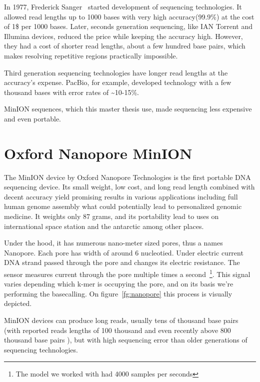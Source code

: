 \documentclass[times, utf8, diplomski, english]{fer}
\begin{document}
In 1977, Frederick Sanger~\citep{mile}\citep{Pettersson2009} started development of sequencing technologies. It allowed read lengths up to 1000 bases with very high accuracy(99.9\%) at the cost of 1\$ per 1000 bases.
Later, seconds generation sequencing, like IAN Torrent and Illumina devices, reduced the price while keeping the accuracy high. However, they had a cost of shorter read lengths, about a few hundred base pairs, which makes resolving repetitive regions practically impossible.

Third generation sequencing technologies have longer read lengths at the accuracy's expense. PacBio, for example, developed technology with a few thousand bases with error rates of \textasciitilde10-15\%. 

MinION sequences, which this master thesis use, made sequencing less expensive and even portable.

\section{Oxford Nanopore MinION}

The MinION device by Oxford Nanopore Technologies is the first portable DNA sequencing device. Its small weight, low cost, and long read length combined with decent accuracy yield promising results in various applications including full human genome assembly \cite{human_seq} what could potentially lead to personalized genomic medicine. It weights only 87 grams, and its portability lead to uses on international space station and the antarctic among other places.

Under the hood, it has numerous nano-meter sized pores, thus a names Nanopore. Each pore has width of around 6 nucleotied. Under electric current DNA strand passed through the pore and changes its electric resistance. The sensor measures current through the pore multiple times a second~\footnote{The model we worked with had 4000 samples per seconds}. This signal varies depending which k-mer is occupying the pore, and on its basis we're performing the basecalling. On figure~\ref{fg:nanopore} this process is visually depicted. 

MinION devices can produce long reads, usually tens of thousand base pairs (with reported reads lengths of 100 thousand \cite{loman1-100k} and even recently above 800 thousand base pairs \cite{loman2-800k}), but with high sequencing error than older generations of sequencing technologies.
\end{document}
